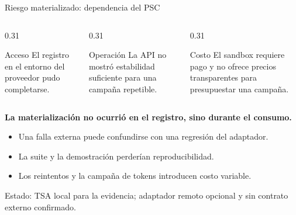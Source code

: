 \begin{frame}{Riesgo materializado: dependencia del PSC}
  \begin{columns}[T,onlytextwidth]
    \begin{column}{0.31\textwidth}
      \begin{exampleblock}{Acceso}
        \small El registro en el entorno del proveedor pudo completarse.
      \end{exampleblock}
    \end{column}
    \begin{column}{0.31\textwidth}
      \begin{alertblock}{Operación}
        \small La API no mostró estabilidad suficiente para una campaña repetible.
      \end{alertblock}
    \end{column}
    \begin{column}{0.31\textwidth}
      \begin{alertblock}{Costo}
        \small El sandbox requiere pago y no ofrece precios transparentes para presupuestar una campaña.
      \end{alertblock}
    \end{column}
  \end{columns}

  \vspace{0.3cm}
  \textbf{La materialización no ocurrió en el registro, sino durante el consumo.}
  \begin{itemize}\scriptsize\setlength{\itemsep}{0cm}
    \item Una falla externa puede confundirse con una regresión del adaptador.
    \item La suite y la demostración perderían reproducibilidad.
    \item Los reintentos y la campaña de tokens introducen costo variable.
  \end{itemize}
  \vspace{0.05cm}
  {\scriptsize\color{gris}Estado: TSA local para la evidencia; adaptador remoto opcional y sin contrato externo confirmado.}
\end{frame}

